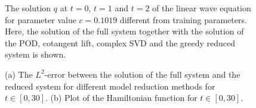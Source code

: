 \begin{figure}
\caption{The solution $q$ at $t=0$, $t=1$ and $t=2$ of the linear wave equation for parameter value $c= 0.1019$ different from training parameters. Here, the solution of the full system together with the solution of the POD, cotangent lift, complex SVD and the greedy reduced system is shown.}
\label{fig:NuRe:1}
\end{figure}

\begin{figure}

\begin{minipage}{.5\linewidth}
\centering
{}
\end{minipage}%
\begin{minipage}{.5\linewidth}
\centering
{}
\end{minipage}\par\medskip
\centering

\caption{(a) The $L^2$-error between the solution of the full system and the reduced system for different model reduction methods for $t \in [0,30]$. (b) Plot of the Hamiltonian function for $t \in [0,30]$. }
\label{fig:NuRe:2}
\end{figure}



